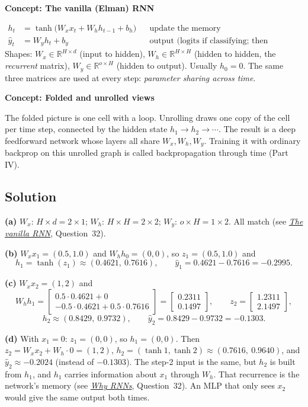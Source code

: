 \documentclass[12pt,a4paper]{article}
\newcommand{\concept}[2]{\par\medskip\phantomsection\label{#1}{\large\bfseries\color{blue!50!black} Concept: #2}\par}
\newcommand{\seeconcept}[3]{(see \hyperref[#1]{\textit{#2}}, Question~#3)}
\begin{document}
\concept{c:vanillarnn}{The vanilla (Elman) RNN}
\begin{align*}
h_t&=\tanh\bigl(W_xx_t+W_hh_{t-1}+b_h\bigr) &&\text{update the memory}\\
\hat y_t&=W_yh_t+b_y &&\text{output (logits if classifying; then softmax)}
\end{align*}
Shapes: $W_x\in\mathbb R^{H\times d}$ (input to hidden), $W_h\in\mathbb R^{H\times H}$ (hidden to hidden, the \emph{recurrent} matrix), $W_y\in\mathbb R^{o\times H}$ (hidden to output). Usually $h_0=0$. The same three matrices are used at every step: \emph{parameter sharing across time}.

\concept{c:unroll}{Folded and unrolled views}
The folded picture is one cell with a loop. Unrolling draws one copy of the cell per time step, connected by the hidden state $h_1\to h_2\to\cdots$. The result is a deep feedforward network whose layers all share $W_x,W_h,W_y$. Training it with ordinary backprop on this unrolled graph is called backpropagation through time (Part IV).

\subsection*{Solution}
\textbf{(a)} $W_x$: $H\times d=2\times1$; $W_h$: $H\times H=2\times2$; $W_y$: $o\times H=1\times2$. All match \seeconcept{c:vanillarnn}{The vanilla RNN}{32}.

\textbf{(b)} $W_xx_1=(0.5,1.0)$ and $W_hh_0=(0,0)$, so $z_1=(0.5,1.0)$ and
\[
h_1=\tanh(z_1)\approx(0.4621,\ 0.7616),\qquad \hat y_1=0.4621-0.7616=-0.2995 .
\]

\textbf{(c)} $W_xx_2=(1,2)$ and
\[
W_hh_1=\begin{bmatrix}0.5\cdot0.4621+0\\-0.5\cdot0.4621+0.5\cdot0.7616\end{bmatrix}=\begin{bmatrix}0.2311\\0.1497\end{bmatrix},
\qquad z_2=\begin{bmatrix}1.2311\\2.1497\end{bmatrix},
\]
\[
h_2\approx(0.8429,\ 0.9732),\qquad \hat y_2=0.8429-0.9732=-0.1303 .
\]

\textbf{(d)} With $x_1=0$: $z_1=(0,0)$, so $h_1=(0,0)$. Then $z_2=W_xx_2+W_h\cdot0=(1,2)$, $h_2=(\tanh1,\tanh2)\approx(0.7616,\ 0.9640)$, and $\hat y_2\approx-0.2024$ (instead of $-0.1303$). The step-2 input is the same, but $h_2$ is built from $h_1$, and $h_1$ carries information about $x_1$ through $W_h$. That recurrence is the network's memory \seeconcept{c:whyrnn}{Why RNNs}{32}. An MLP that only sees $x_2$ would give the same output both times.
\end{document}
